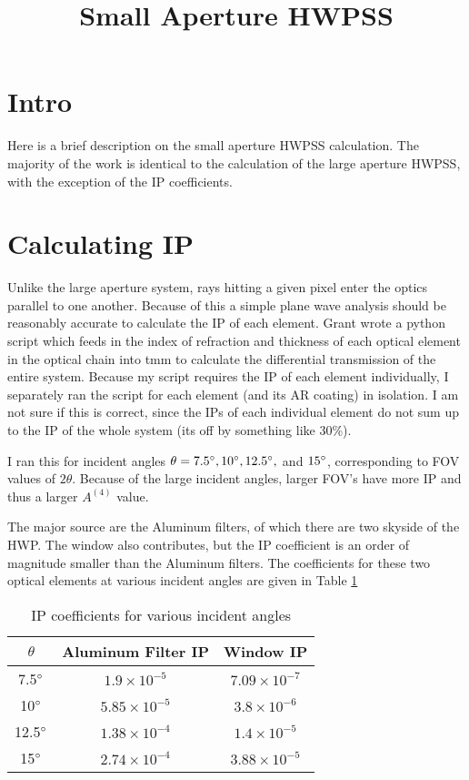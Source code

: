 \documentclass{article}
\title{Small Aperture HWPSS}
\author{}
\date{}
\theoremstyle{remark}
\newcommand{\A}[1]{A^{(#1)}}
\begin{document}
\maketitle

\section{Intro}
Here is a brief description on the small aperture HWPSS calculation. 
The majority of the work is identical to the calculation of the large aperture HWPSS, with the exception of the IP coefficients.

\section{Calculating IP}
Unlike the large aperture system, rays hitting a given pixel enter the optics parallel to one another. 
Because of this a simple plane wave analysis should be reasonably accurate to calculate the IP of each element. 
Grant wrote a python script which feeds in the index of refraction and thickness of each optical element in the optical chain into tmm to calculate the differential transmission of the entire system.
Because my script requires the IP of each element individually, I separately ran the script for each element (and its AR coating) in isolation.
I am not sure if this is correct, since the IPs of each individual element do not sum up to the IP of the whole system (its off by something like 30\%).

I ran this for incident angles $\theta = 7.5\degree, 10 \degree, 12.5\degree, $ and $15\degree$,
corresponding to FOV values of $2 \theta$.
Because of the large incident angles, larger FOV's have more IP and thus a larger $\A4$ value.

The major source are the Aluminum filters, of which there are two skyside of the HWP. 
The window also contributes, but the IP coefficient is an order of magnitude smaller than the Aluminum filters.
The coefficients for these two optical elements at various incident angles are given in Table \ref{table:IP_coeffs}

\begin{table}[h]
\centering

\begin{tabular}{|c|c|c|}
\hline
$\theta $       & Aluminum Filter IP   & Window IP            \\
\hline
7.5$\degree$  & $1.9\times 10^{-5}$  & $7.09\times 10^{-7}$ \\
10$\degree$   & $5.85\times 10^{-5}$ & $3.8\times 10^{-6}$  \\
12.5$\degree$ & $1.38\times 10^{-4}$ & $1.4\times 10^{-5}$   \\
15$\degree$   & $2.74\times 10^{-4}$ & $3.88\times 10^{-5}$ \\\hline
\end{tabular}
\caption{ IP coefficients for various incident angles
}
\label{table:IP_coeffs}
\end{table}
\end{document}
